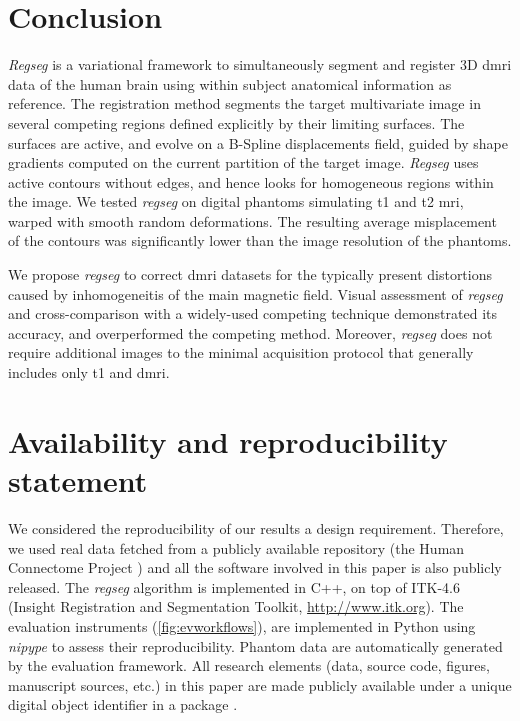 \section*{Conclusion}
\label{sec:conclusion}

\emph{Regseg} is a variational framework to simultaneously segment and
  register 3D \gls*{dmri} data of the human brain using within subject
  anatomical information as reference.
The registration method segments the target multivariate image in several competing regions
  defined explicitly by their limiting surfaces.
The surfaces are active, and evolve on a B-Spline displacements field, guided by shape
  gradients computed on the current partition of the target image.
\emph{Regseg} uses active contours without edges, and hence looks for
  homogeneous regions within the image.
We tested \emph{regseg} on digital phantoms simulating \gls*{t1} and \gls*{t2} \gls*{mri},
	warped with smooth random deformations.
The resulting average misplacement of the contours was significantly lower than the
  image resolution of the phantoms.

We propose \emph{regseg} to correct \gls*{dmri} datasets for the typically present distortions
  caused by inhomogeneitis of the main magnetic field.
Visual assessment of \emph{regseg} and cross-comparison with a widely-used competing
  technique demonstrated its accuracy, and overperformed the competing method.
Moreover, \emph{regseg} does not require additional images to the minimal acquisition protocol
  that generally includes only \gls*{t1} and \gls*{dmri}.

\section*{Availability and reproducibility statement}
\label{sec:availability}
We considered the reproducibility of our results a design requirement.
Therefore, we used real data fetched from a publicly available repository
  (the Human Connectome Project \citep{essen_human_2012}) and all the software
  involved in this paper is also publicly released.
The \emph{regseg} algorithm is implemented in C++, on top of ITK-4.6
  (Insight Registration and Segmentation Toolkit, \url{http://www.itk.org}).
The evaluation instruments (\autoref{fig:evworkflows}), are implemented in Python using
  \emph{nipype} \citep{gorgolewski_nipype_2011} to assess their reproducibility.
Phantom data are automatically generated by the evaluation framework.
All research elements (data, source code, figures, manuscript sources, etc.) in this paper
  are made publicly available under a unique digital object identifier in a
  package \citep{esteban_acweregistration_2015}.